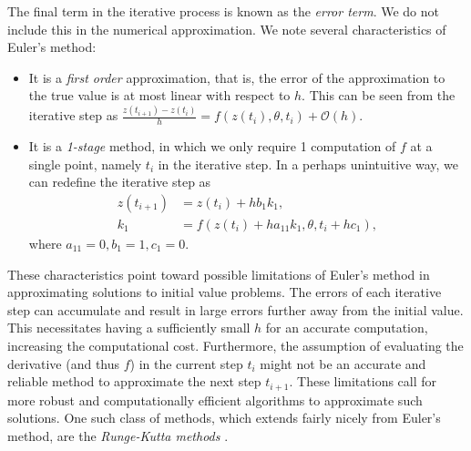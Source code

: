 \documentclass[a4paper,11pt,titlepage]{article}
\theoremstyle{definition}
\theoremstyle{plain}
\theoremstyle{remark}
\begin{document}
The final term in the iterative process is known as the \textit{error term}. We do not include this in the numerical approximation. We note several characteristics of Euler's method:
\begin{itemize}
    \item It is a \textit{first order} approximation, that is, the error of the approximation to the true value is at most linear with respect to $h$. This can be seen from the iterative step as $\frac{z(t_{i+1}) - z(t_i)}{h} = f(z(t_i),\theta,t_i) + \mathcal{O}(h)$.
    \item It is a \textit{1-stage} method, in which we only require 1 computation of $f$ at a single point, namely $t_i$ in the iterative step. In a perhaps unintuitive way, we can redefine the iterative step as 
    \begin{align*}
        z(t_{i+1}) &= z(t_i) + h b_1 k_1, \\
        k_1 &= f\left(z(t_i) + h a_{11}k_1, \theta, t_i + hc_1\right),
    \end{align*}
    where $a_{11} = 0, b_1 = 1, c_1 = 0$.
\end{itemize}

These characteristics point toward possible limitations of Euler's method in approximating solutions to initial value problems. The errors of each iterative step can accumulate and result in large errors further away from the initial value. This necessitates having a sufficiently small $h$ for an accurate computation, increasing the computational cost. Furthermore, the assumption of evaluating the derivative (and thus $f$) in the current step $t_i$ might not be an accurate and reliable method to approximate the next step $t_{i+1}$. These limitations call for more robust and computationally efficient algorithms to approximate such solutions. One such class of methods, which extends fairly nicely from Euler's method, are the \textit{Runge-Kutta methods} \cite{sulimayers2003}.
\end{document}
